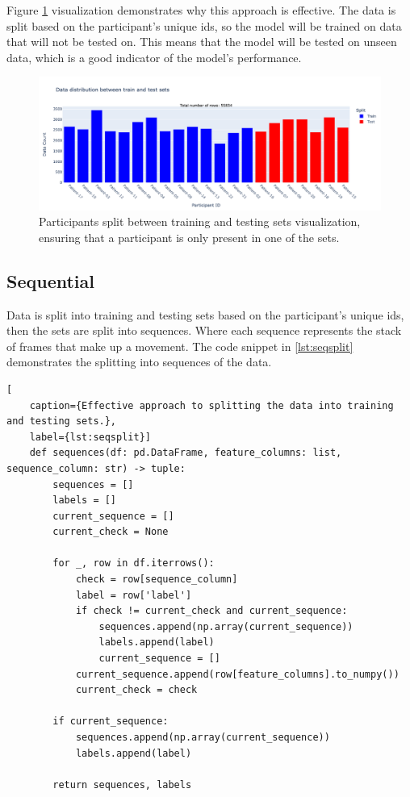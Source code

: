             Figure \ref{fig:goodsplit} visualization demonstrates why this approach is effective. The data is split based on the participant's unique ids, so the model will be trained on data that will not be tested on. This means that the model will be tested on unseen data, which is a good indicator of the model's performance.

            \begin{figure}[H]
                \centering
                \includegraphics[width=1.0\textwidth]{../src/resources/plots/splits/good.png}
                \caption{
                    Participants split between training and testing sets visualization, ensuring that a participant is only present in one of the sets.
                }
                \label{fig:goodsplit}
            \end{figure}

    \newpage
            
            \subsection{Sequential} \label{sec:seqsplit}
            Data is split into training and testing sets based on the participant's unique ids, then the sets are split into sequences. Where each sequence represents the stack of frames that make up a movement. The code snippet in \ref{lst:seqsplit} demonstrates the splitting into sequences of the data. 

\begin{lstlisting}[
    caption={Effective approach to splitting the data into training and testing sets.}, 
    label={lst:seqsplit}]                
    def sequences(df: pd.DataFrame, feature_columns: list, sequence_column: str) -> tuple:
        sequences = []
        labels = []
        current_sequence = []
        current_check = None

        for _, row in df.iterrows():
            check = row[sequence_column]
            label = row['label']
            if check != current_check and current_sequence:
                sequences.append(np.array(current_sequence))
                labels.append(label)
                current_sequence = []
            current_sequence.append(row[feature_columns].to_numpy())
            current_check = check

        if current_sequence: 
            sequences.append(np.array(current_sequence))
            labels.append(label)

        return sequences, labels
\end{lstlisting}

